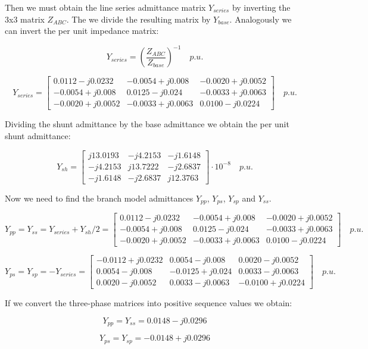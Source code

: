 \documentclass[a4paper,twoside]{tufte-book}
\begin{document}
Then we must obtain the line series admittance matrix $Y_{series}$ by inverting the 3x3 matrix $Z_{ABC}$. The we divide the resulting matrix by $Y_{base}$. Analogously we can invert the per unit impedance matrix:

$$
Y_{series} = \left(\frac{Z_{ABC}}{Z_{base}}\right)^{-1} \quad p.u.
$$

$$
Y_{series} = \left[ \begin{array}{ccc}
0.0112-j0.0232  & -0.0054+j0.008   & -0.0020+j0.0052 \\ -0.0054+j0.008  &  0.0125-j0.024 & -0.0033+j0.0063 \\ -0.0020+j0.0052 &  -0.0033+j0.0063 & 0.0100-j0.0224
\end{array} \right]\quad  p.u.
$$

Dividing the shunt admittance by the base admittance we obtain the per unit shunt admittance:

$$
Y_{sh} = \left[ \begin{array}{ccc}
j13.0193 & -j4.2153 &  -j1.6148 \\
-j4.2153 & j13.7222 & -j2.6837 \\ 
-j1.6148 & -j2.6837 & j12.3763
\end{array} \right] \cdot 10^{-8}  \quad p.u.
$$

Now we need to find the branch model admittances $Y_{pp}$, $Y_{ps}$, $Y_{sp}$ and $Y_{ss}$.

$$
Y_{pp} = Y_{ss} = Y_{series} + Y_{sh}/2 = \left[ \begin{array}{ccc}
0.0112-j0.0232  & -0.0054+j0.008   & -0.0020+j0.0052 \\ -0.0054+j0.008  &  0.0125-j0.024 & -0.0033+j0.0063 \\ -0.0020+j0.0052 &  -0.0033+j0.0063 & 0.0100-j0.0224
\end{array} \right]\quad  p.u.
$$

$$
Y_{ps} = Y_{sp} = -Y_{series} = \left[ \begin{array}{ccc}
-0.0112+j0.0232  & 0.0054-j0.008   & 0.0020-j0.0052 \\  0.0054-j0.008  &  -0.0125+j0.024 & 0.0033-j0.0063 \\  0.0020-j0.0052 &  0.0033-j0.0063 & -0.0100+j0.0224
\end{array} \right]\quad  p.u.
$$

If we convert the three-phase matrices into positive sequence values we obtain:

$$
Y_{pp} = Y_{ss} = 0.0148 -j0.0296
$$

$$
Y_{ps} = Y_{sp} = -0.0148 +j0.0296
$$
\end{document}
